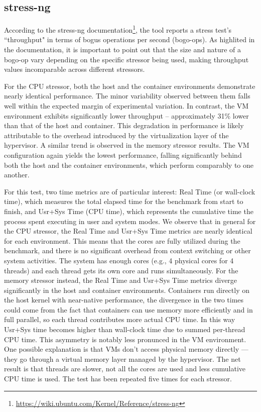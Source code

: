 \subsection{stress-ng}

According to the stress-ng documentation\footnote{\url{https://wiki.ubuntu.com/Kernel/Reference/stress-ng}}, the tool reports a stress test's ``throughput" in terms of bogus operations per second (bogo-ops). As highlited in the documentation, it is important to point out that the size and nature of a bogo-op vary depending on the specific stressor being used, making throughput values incomparable across different stressors.

For the CPU stressor, both the host and the container environments demonstrate nearly identical performance. The minor variability observed between them falls well within the expected margin of experimental variation. In contrast, the VM environment exhibits significantly lower throughput -- approximately 31\% lower than that of the host and container. This degradation in performance is likely attributable to the overhead introduced by the virtualization layer of the hypervisor. A similar trend is observed in the memory stressor results. The VM configuration again yields the lowest performance, falling significantly behind both the host and the container environments, which perform comparably to one another.

For this test, two time metrics are of particular interest: Real Time (or wall-clock time), which measures the total elapsed time for the benchmark from start to finish, and Usr+Sys Time (CPU time), which represents the cumulative time the process spent executing in user and system modes. We observe that in general for the CPU stressor, the Real Time and Usr+Sys Time metrics are nearly identical for each environment. This means that the cores are fully utilized during the benchmark, and there is no significant overhead from context switching or other system activities. The system has enough cores (e.g., 4 physical cores for 4 threads) and each thread gets its own core and runs simultaneously. For the memory stressor instead, the Real Time and Usr+Sys Time metrics diverge significantly in the host and container environments. Containers run directly on the host kernel with near-native performance, the divergence in the two times could come from the fact that containers can use memory more efficiently and in full parallel, so each thread contributes more actual CPU time. In this way Usr+Sys time becomes higher than wall-clock time due to summed per-thread CPU time. This asymmetry is notably less pronunced in the VM environment. One possible explanation is that VMs don't access physical memory directly — they go through a virtual memory layer managed by the hypervisor. The net result is that threads are slower, not all the cores are used and less cumulative CPU time is used.
The test has been repeated five times for each stressor.

